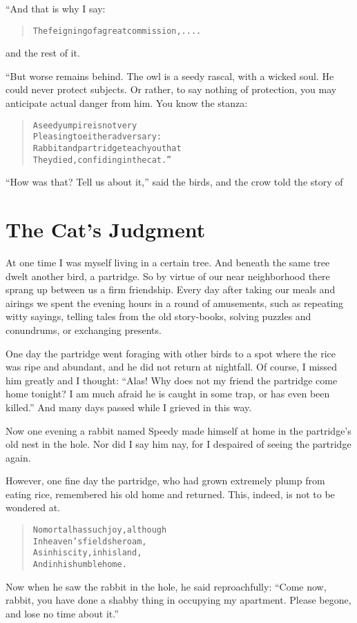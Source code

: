 \documentclass[article, twoside, 14pt]{memoir}
\renewenvironment{verbatim}{%
\begin{quote}%
\vskip -10pt%
\begin{alltt}\normalfont\large}{\end{alltt}%
\end{quote}%
\vskip -10pt
} %
\begin{document}
“And that is why I say:

\begin{verbatim}
The feigning of a great commission,....
\end{verbatim}
and the rest of it.

“But worse remains behind. The owl is a seedy rascal, with a wicked
soul. He could never protect subjects. Or rather, to say nothing of
protection, you may anticipate actual danger from him. You know the
stanza:

\begin{verbatim}
A seedy umpire is not very
Pleasing to either adversary:
Rabbit and partridge teach you that{\textemdash}
They died, confiding in the cat.”
\end{verbatim}
``How was that? Tell us about it,'' said the birds, and the crow
told the story of

\chapter{The Cat's Judgment}

\label{s50}

At one time I was myself living in a certain tree. And
beneath the same tree dwelt another bird, a partridge. So by virtue
of our near neighborhood there sprang up between us a firm
friendship. Every day after taking our meals and airings we spent
the evening hours in a round of amusements, such as repeating witty
sayings, telling tales from the old story-books, solving puzzles
and conundrums, or exchanging presents.

One day the partridge went foraging with other birds to a spot
where the rice was ripe and abundant, and he did not return at
nightfall. Of course, I missed him greatly and I thought:
``Alas! Why does not my friend the partridge come home tonight? I am much afraid he is caught in some trap, or has even been killed.''
And many days passed while I grieved in this way.

Now one evening a rabbit named Speedy made himself at home in the
partridge's old nest in the hole. Nor did I say him nay, for I
despaired of seeing the partridge again.

However, one fine day the partridge, who had grown extremely plump
from eating rice, remembered his old home and returned. This,
indeed, is not to be wondered at.

\begin{verbatim}
No mortal has such joy, although
    In heaven's fields he roam,
As in his city, in his land,
    And in his humble home.
\end{verbatim}
Now when he saw the rabbit in the hole, he said reproachfully:
``Come now, rabbit, you have done a shabby thing in occupying my apartment. Please begone, and lose no time about it.''
\end{document}
